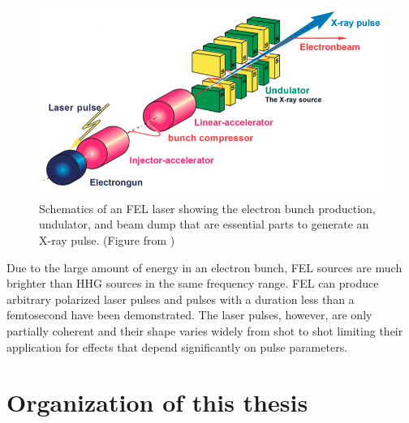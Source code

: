 \begin{figure}[!ht]
\centering
\includegraphics[width=0.8\columnwidth]{figs/Intro/FEL.png}
\caption{\label{fig:FEL_diagram} Schematics of an FEL laser showing the electron bunch production, undulator, and beam dump that are essential parts to generate an X-ray pulse. (Figure from \cite{rauschenbergerFEL})
}
\end{figure}

Due to the large amount of energy in an electron bunch, FEL sources are much brighter than HHG sources in the same frequency range. FEL can produce arbitrary polarized laser pulses and pulses with a duration less than a femtosecond have been demonstrated. The laser pulses, however, are only partially coherent and their shape varies widely from shot to shot limiting their application for effects that depend significantly on pulse parameters.

\section{Organization of this thesis} %
\label{sec:organization_of_this_thesis}

